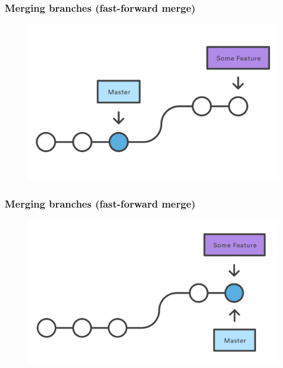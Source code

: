 \documentclass{beamer}
\begin{document}
\begin{frame}
\frametitle{Merging branches (fast-forward merge)}

\begin{figure}
\includegraphics[scale=0.8]{figures/f13.png}
\end{figure}

\end{frame}

\begin{frame}
\frametitle{Merging branches (fast-forward merge)}

\begin{figure}
\includegraphics[scale=0.8]{figures/f14.png}
\end{figure}

\end{frame}
\end{document}
